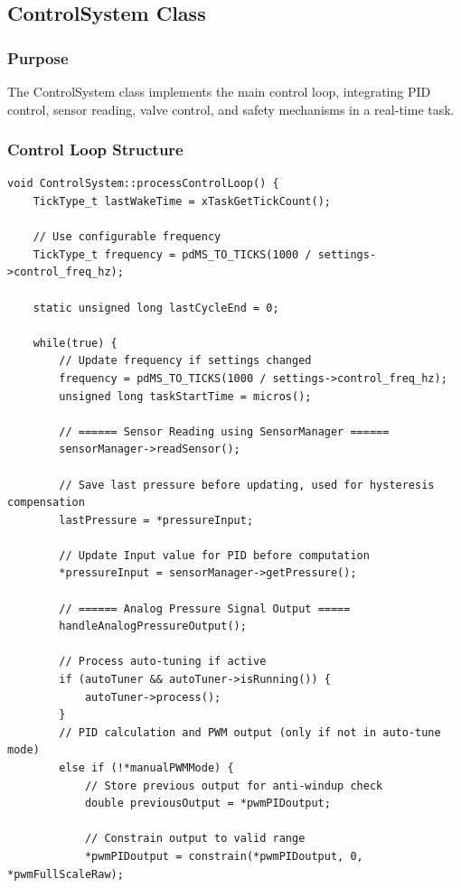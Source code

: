 \documentclass[12pt,a4paper]{article}
\begin{document}
\subsection{ControlSystem Class}

\subsubsection{Purpose}
The ControlSystem class implements the main control loop, integrating PID control, sensor reading, valve control, and safety mechanisms in a real-time task.

\subsubsection{Control Loop Structure}
\begin{lstlisting}[caption=Control Loop Implementation - Actual Code from ControlSystem.cpp]
void ControlSystem::processControlLoop() {
    TickType_t lastWakeTime = xTaskGetTickCount();
    
    // Use configurable frequency
    TickType_t frequency = pdMS_TO_TICKS(1000 / settings->control_freq_hz);
    
    static unsigned long lastCycleEnd = 0;
    
    while(true) {
        // Update frequency if settings changed
        frequency = pdMS_TO_TICKS(1000 / settings->control_freq_hz);
        unsigned long taskStartTime = micros();
        
        // ====== Sensor Reading using SensorManager ======
        sensorManager->readSensor();
        
        // Save last pressure before updating, used for hysteresis compensation
        lastPressure = *pressureInput;
        
        // Update Input value for PID before computation
        *pressureInput = sensorManager->getPressure();
        
        // ====== Analog Pressure Signal Output =====
        handleAnalogPressureOutput();
        
        // Process auto-tuning if active
        if (autoTuner && autoTuner->isRunning()) {
            autoTuner->process();
        }
        // PID calculation and PWM output (only if not in auto-tune mode)
        else if (!*manualPWMMode) {
            // Store previous output for anti-windup check
            double previousOutput = *pwmPIDoutput;
            
            // Constrain output to valid range
            *pwmPIDoutput = constrain(*pwmPIDoutput, 0, *pwmFullScaleRaw); 


\end{lstlisting}
\end{document}
